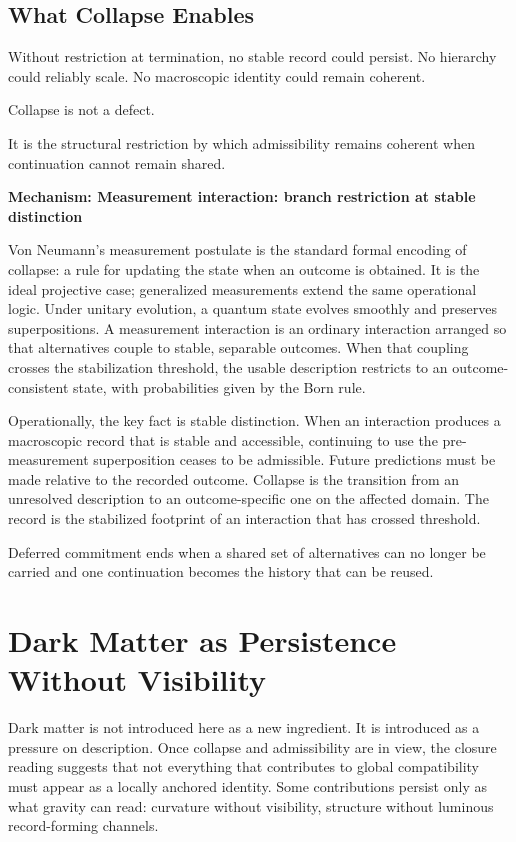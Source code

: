 \documentclass[11pt,twoside,openright]{book}
\newenvironment{mechanismbox}[1]
  {\begin{framed}\noindent\textbf{Mechanism: #1}\par\medskip}
  {\end{framed}}
\begin{document}
\section*{What Collapse Enables}

Without restriction at termination, no stable record could persist. No hierarchy could reliably scale. No macroscopic identity could remain coherent.

Collapse is not a defect.

It is the structural restriction by which admissibility remains coherent when continuation cannot remain shared.

\begin{mechanismbox}{Measurement interaction: branch restriction at stable distinction}

Von Neumann's measurement postulate is the standard formal encoding of collapse: a rule for updating the state when an outcome is obtained. It is the ideal projective case; generalized measurements extend the same operational logic. Under unitary evolution, a quantum state evolves smoothly and preserves superpositions. A measurement interaction is an ordinary interaction arranged so that alternatives couple to stable, separable outcomes. When that coupling crosses the stabilization threshold, the usable description restricts to an outcome-consistent state, with probabilities given by the Born rule.

Operationally, the key fact is stable distinction. When an interaction produces a macroscopic record that is stable and accessible, continuing to use the pre-measurement superposition ceases to be admissible. Future predictions must be made relative to the recorded outcome. Collapse is the transition from an unresolved description to an outcome-specific one on the affected domain. The record is the stabilized footprint of an interaction that has crossed threshold.

Deferred commitment ends when a shared set of alternatives can no longer be carried and one continuation becomes the history that can be reused.

\end{mechanismbox}

\chapter{Dark Matter as Persistence Without Visibility}

Dark matter is not introduced here as a new ingredient. It is introduced as a pressure on description. Once collapse and admissibility are in view, the closure reading suggests that not everything that contributes to global compatibility must appear as a locally anchored identity. Some contributions persist only as what gravity can read: curvature without visibility, structure without luminous record-forming channels.
\end{document}
